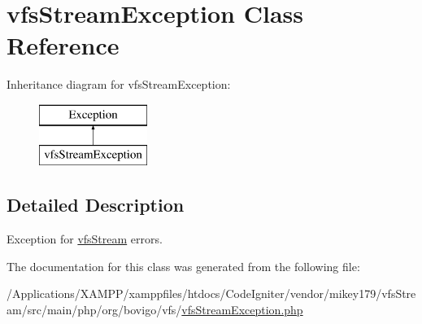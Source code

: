 \hypertarget{classorg_1_1bovigo_1_1vfs_1_1vfs_stream_exception}{}\section{vfs\+Stream\+Exception Class Reference}
\label{classorg_1_1bovigo_1_1vfs_1_1vfs_stream_exception}
Inheritance diagram for vfs\+Stream\+Exception\+:\begin{figure}[H]
\begin{center}
\leavevmode
\includegraphics[height=2.000000cm]{classorg_1_1bovigo_1_1vfs_1_1vfs_stream_exception}
\end{center}
\end{figure}


\subsection{Detailed Description}
Exception for \mbox{\hyperlink{classorg_1_1bovigo_1_1vfs_1_1vfs_stream}{vfs\+Stream}} errors.

The documentation for this class was generated from the following file\+:\begin{DoxyCompactItemize}
\item 
/\+Applications/\+X\+A\+M\+P\+P/xamppfiles/htdocs/\+Code\+Igniter/vendor/mikey179/vfs\+Stream/src/main/php/org/bovigo/vfs/\mbox{\hyperlink{vfs_stream_exception_8php}{vfs\+Stream\+Exception.\+php}}\end{DoxyCompactItemize}
